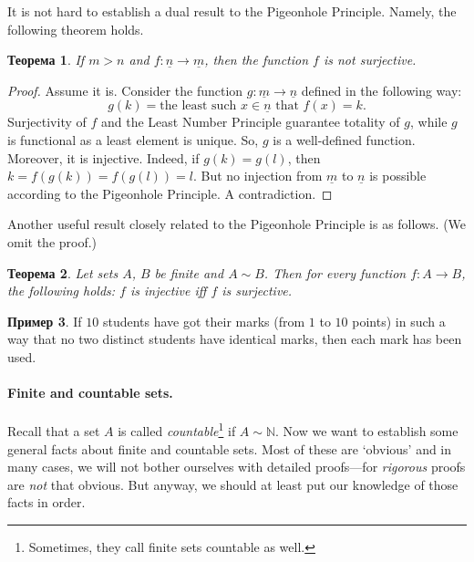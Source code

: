 \documentclass[12pt,notitlepage]{article}
\theoremstyle{plain}
\newtheorem{thm}{Теорема}[section]
\theoremstyle{definition}
\newtheorem{exm}[thm]{Пример}
\theoremstyle{plain}
\newcommand{\N}{\mathbb{N}}
\newcommand{\ul}[1]{\underline{#1}}
\newcommand{\1}{\mathbf{1}}
\newcommand{\0}{\mathbf{0}}
\newcommand{\mcomm}[1]{}
\begin{document}
It is not hard to establish a dual result to the Pigeonhole Principle. Namely, the following theorem holds.
\begin{thm}\label{L10:pigeon_dual}
	If $m > n$ and $f\colon \ul{n} \to \ul{m}$, then the function $f$ is not surjective.
\end{thm}
\begin{proof}
	Assume it is. Consider the function $g\colon \ul{m} \to \ul{n}$ defined in the following way:
	$$g(k) = \mbox{the least such $x \in \ul{n}$ that } f(x) = k.$$
	Surjectivity of $f$ and the Least Number Principle guarantee totality of $g$, while $g$ is functional as a least element is unique. So, $g$ is a well-defined function. Moreover, it is injective. Indeed, if $g(k) = g(l)$, then $k = f(g(k)) = f(g(l)) = l$. But no injection from $\ul{m}$ to $\ul{n}$ is possible according to the Pigeonhole Principle. A contradiction.
\end{proof}

Another useful result closely related to the Pigeonhole Principle is as follows. (We omit the proof.)
\begin{thm}\label{L10:fin_sur_in}
	Let sets $A$, $B$ be finite and $A \sim B$. Then for every function $f\colon A \to B$, the following holds: $f$ is injective iff $f$ is surjective.
\end{thm}
\mcomm{In fact, one can easily prove that every injection $A \to B$ is surjective under assumption that a proper subset of a finite set is smaller than that set. The latter statement follows from the  Rule of Sum, which we prove below. A forward reference is unwanted here, so we omit the proof, which can be postponed for a seminar class, though. Another---far less elegant---way to prove surjectivity is similar to that of Theorem~\ref{L10:dirichlet}. Next, one can prove injectivity of every surjection $f\colon A \to B$ by constructing its right inverse $g$ (like we have done when proving Theorem~\ref{L10:pigeon_dual}), which is clearly injective. By the first claim, $g$ must be bijective and $f = g^{-1}$.}
\begin{exm}
	If $10$ students have got their marks (from $1$ to $10$ points) in such a way that no two distinct students have identical marks, then each mark has been used.
\end{exm}

\paragraph{Finite and countable sets.} Recall that a set $A$ is  called \emph{countable}\footnote{Sometimes, they call finite sets countable as well.} if $A \sim \N$. Now we want to establish some general facts about finite and countable sets. Most of these are `obvious' and in many cases, we will not bother ourselves with detailed proofs---for \emph{rigorous} proofs are \emph{not} that obvious. But anyway, we should at least put our knowledge of those facts in order.
\end{document}
